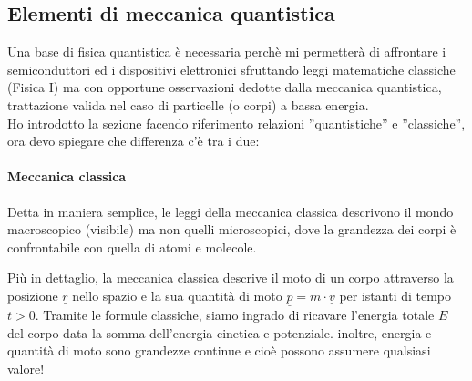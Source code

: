 \subsection{Elementi di meccanica quantistica}
Una base di fisica quantistica è necessaria perchè mi permetterà di affrontare i semiconduttori ed i dispositivi elettronici sfruttando leggi matematiche classiche (Fisica I) ma con opportune osservazioni dedotte dalla meccanica quantistica, trattazione valida nel caso di particelle (o corpi) a bassa energia.\\
Ho introdotto la sezione facendo riferimento relazioni ''quantistiche'' e ''classiche'', ora devo spiegare che differenza c'è tra i due:
%
\paragraph{Meccanica classica}
Detta in maniera semplice, le leggi della meccanica classica descrivono il mondo
macroscopico (visibile) ma non quelli microscopici, dove la grandezza dei corpi è
confrontabile con quella di atomi e molecole.

Più in dettaglio, la meccanica classica descrive il moto di un corpo attraverso la posizione $\underline{r}$ nello spazio e la sua quantità di moto $\underline{p} = m \cdot \underline{v}$ per istanti di tempo $t > 0$. Tramite le formule classiche, siamo ingrado di ricavare l'energia totale $E$ del corpo data la somma dell'energia cinetica e potenziale.
inoltre, energia e quantità di moto sono grandezze continue e cioè possono assumere qualsiasi valore!\\
%
